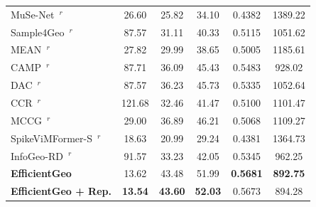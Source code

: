 \begin{table}[!b]
{\begin{tabular}{lccccc}
MuSe-Net~\cite{wang2024musenet}$^{r}$ & 26.60 & 25.82 & 34.10 & 0.4382 & 1389.22 \\
Sample4Geo~\cite{deuser2023sample4geo}$^{r}$ & 87.57 & 31.11 & 40.33 & 0.5115 & 1051.62 \\
MEAN~\cite{chen2025mean}$^{r}$ & 27.82 & 29.99 & 38.65 & 0.5005 & 1185.61 \\
CAMP~\cite{wu2024camp}$^{r}$ & 87.71 & 36.09 & 45.43 & 0.5483 & 928.02 \\
DAC~\cite{xia2024dac}$^{r}$ & 87.57 & 36.23 & 45.73 & 0.5335 & 1052.64 \\
CCR~\cite{du2024ccr}$^{r}$ & 121.68 & 32.46 & 41.47 & 0.5100 & 1101.47 \\
MCCG~\cite{shen2024mccg}$^{r}$ & 29.00 & 36.89 & 46.21 & 0.5068 & 1109.27 \\
SpikeViMFormer-S~\cite{chen2026spikevimformer}$^{r}$ & 18.63 & 20.99 & 29.24 & 0.4381 & 1364.73 \\
InfoGeo-RD~\cite{zhang2026infogeo}$^{r}$ & 91.57 & 33.23 & 42.05 & 0.5345 & 962.25 \\
\midrule
\textbf{EfficientGeo} & 13.62 & 43.48 & 51.99 & \textbf{0.5681} & \textbf{892.75} \\
\textbf{EfficientGeo + Rep.} & \textbf{13.54} & \textbf{43.60} & \textbf{52.03} & 0.5673 & 894.28 \\
\bottomrule
\end{tabular}}
\par{}
\end{table}
